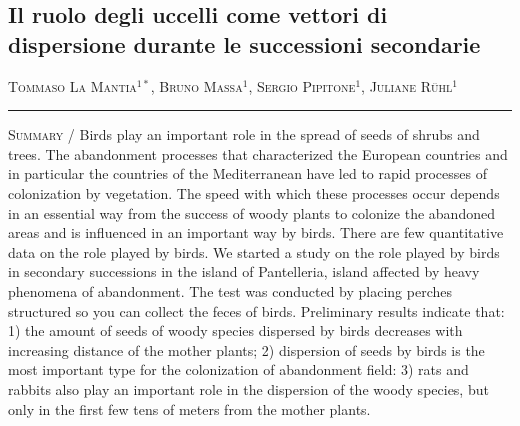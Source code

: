 \setcounter{figure}{0}
\setcounter{table}{0}

\begin{adjustwidth}{-3.5cm}{0cm}
\pagestyle{CIOpage}
\chapter*[Gli uccelli come vettori di dispersione dei semi]{\bfseries
Il ruolo degli uccelli come vettori di dispersione durante le
successioni secondarie}

\textsc{Tommaso La Mantia}$^{1*}$, \textsc{Bruno Massa}$^1$,
\textsc{Sergio Pipitone}$^1$, \textsc{Juliane R\"uhl}$^1$ \\

   
\noindent\color{MUSEBLUE}\rule{27cm}{2pt}
\vspace{1cm}
\end{adjustwidth}



{\small
\noindent \textsc{\color{MUSEBLUE} Summary} / Birds play an important role in the spread of seeds of shrubs and trees.
The abandonment processes that characterized the European countries and
in particular the countries of the Mediterranean have led to rapid
processes of colonization by vegetation. The speed with which these
processes occur depends in an essential way from the success of woody
plants to colonize the abandoned areas and is influenced in an
important way by birds. There are few quantitative data on the role
played by birds. We started a study on the role played by birds in
secondary successions in the island of Pantelleria, island affected by
heavy phenomena of abandonment. The test was conducted by placing
perches structured so you can collect the feces of birds. Preliminary
results indicate that: 1) the amount of seeds of woody species
dispersed by birds decreases with increasing distance of the mother
plants; 2) dispersion of seeds by birds is the most important type for
the colonization of abandonment field: 3) rats and rabbits also play an
important role in the dispersion of the woody species, but only in the
first few tens of meters from the mother plants.\\
}

